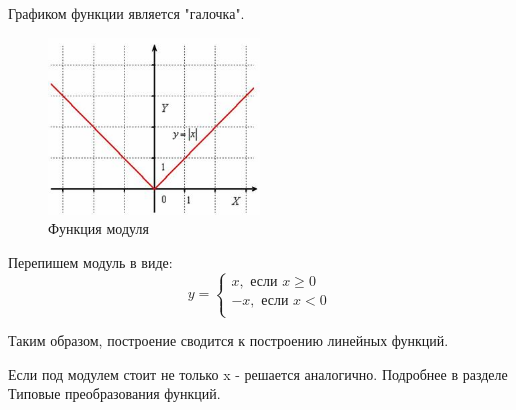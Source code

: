 Графиком функции является "галочка".

\begin{figure}[h!]
	\centering
	\includegraphics[width=0.5\textwidth]{img/image377.jpg}
	\caption{Функция модуля}
\end{figure}

Перепишем модуль в виде:
\begin{equation*}
    y =
    \begin{cases}
    x, \text{ если } x\geq0 \\
    -x, \text{ если } x<0 \\
    \end{cases}
\end{equation*}

Таким образом, построение сводится к построению линейных функций.

Если под модулем стоит не только x - решается аналогично. Подробнее в разделе Типовые преобразования функций.


